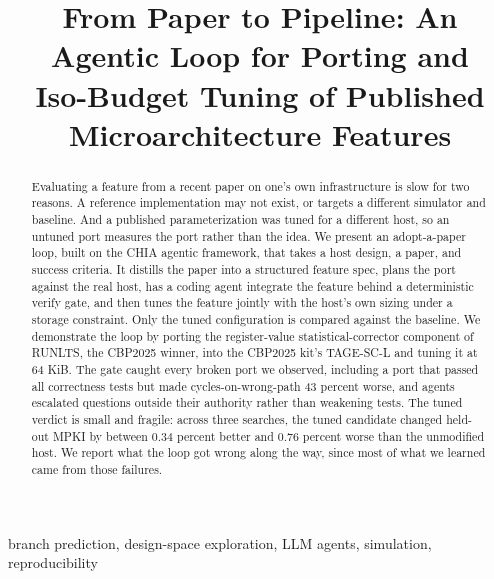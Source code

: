 \documentclass[conference]{IEEEtran}
\newcommand{\todo}[1]{\textcolor{red}{[TODO: #1]}}
\begin{document}
\title{From Paper to Pipeline: An Agentic Loop for Porting and\\
Iso-Budget Tuning of Published Microarchitecture Features}

\author{
\and
{}
\IEEEauthorblockA{\textit{\todo{affiliation}}\\
\todo{email}}
}

\maketitle

\begin{abstract}
Evaluating a feature from a recent paper on one's own infrastructure is slow
for two reasons. A reference implementation may not exist, or targets a
different simulator and baseline. And a published parameterization was tuned
for a different host, so an untuned port measures the port rather than the
idea. We present an adopt-a-paper loop, built on the CHIA agentic framework,
that takes a host design, a paper, and success criteria. It distills the paper
into a structured feature spec, plans the port against the real host, has a
coding agent integrate the feature behind a deterministic verify gate, and then
tunes the feature jointly with the host's own sizing under a storage
constraint. Only the tuned configuration is compared against the baseline. We
demonstrate the loop by porting the register-value statistical-corrector
component of RUNLTS, the CBP2025 winner, into the CBP2025 kit's TAGE-SC-L and
tuning it at 64 KiB. The gate caught every broken port we observed, including a
port that passed all correctness tests but made cycles-on-wrong-path 43 percent
worse, and agents escalated questions outside their authority rather than
weakening tests. The tuned verdict is small and fragile: across three searches,
the tuned candidate changed held-out MPKI by between 0.34 percent better and
0.76 percent worse than the unmodified host. We report what the loop got wrong
along the way, since most of what we learned came from those failures.
\end{abstract}

\begin{IEEEkeywords}
branch prediction, design-space exploration, LLM agents, simulation,
reproducibility
\end{IEEEkeywords}
\end{document}
